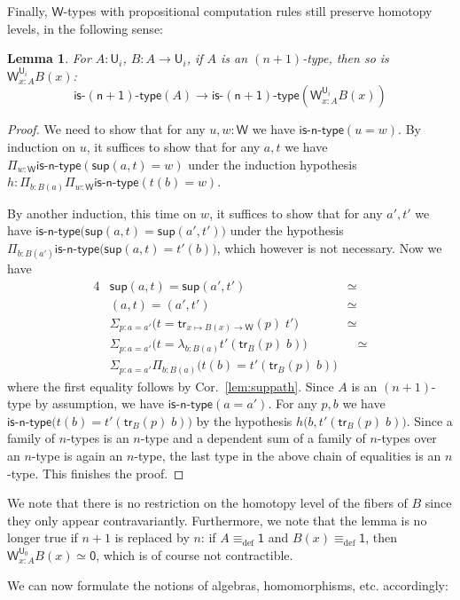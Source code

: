\documentclass[reqno,10pt,a4paper,oneside]{amsart}
\numberwithin{equation}{section}
\theoremstyle{mythm}
\newtheorem{lemma}[theorem]{Lemma}
\theoremstyle{mydef}
\theoremstyle{myrmk}
\newcommand{\deq}{\equiv}
\newcommand{\defeq}{\deq_{\mathrm{def}}}
\newcommand{\isntype}[1]{\mathsf{is}\text{-}\mathsf{#1}\text{-}\mathsf{type}}
\newcommand{\trans}{\mathsf{tr}}
\newcommand{\prd}[1]{\Pi_{#1}}
\newcommand{\sm}[1]{\Sigma_{#1}}
\newcommand{\lam}[1]{\lambda_{#1}}
\newcommand{\W}{\mathsf{W}}
\newcommand{\wsup}{\mathsf{sup}}
\newcommand{\one}{\mathsf{1}}
\newcommand{\zero}{\mathsf{0}}
\newcommand{\UU}{\mathsf{U}}
\begin{document}
Finally, $\W$-types with propositional computation rules still preserve homotopy levels, in the following sense:
\begin{lemma}
For $A:\UU_i$, $B : A \to \UU_i$, if $A$ is an $(n+1)$-type, then so is $\W^{\UU_i}_{x:A} B(x)$:
\[ \isntype{(n+1)}(A) \to \isntype{(n+1)}(\W^{\UU_i}_{x:A} B(x))\]
\end{lemma}
\begin{proof}
We need to show that for any $u,w : \W$ we have $\isntype{n}(u = w)$. By induction on $u$, it suffices to show that for any $a,t$ we have $\prd{w:\W} \isntype{n}(\wsup(a,t) = w)$ under the induction hypothesis $h : \prd{b:B(a)}\prd{w:\W} \isntype{n}(t(b) = w)$. 

By another induction, this time on $w$, it suffices to show that for any $a',t'$ we have
$\isntype{n}\big(\wsup(a,t) = \wsup(a',t')\big)$ under the hypothesis $\prd{b:B(a')} \isntype{n}\big(\wsup(a,t) = t'(b)\big)$, which however is not necessary. Now we have
\begin{alignat*}{4}
& \wsup(a,t) = \wsup(a',t') & \simeq \\
& (a,t) = (a',t') & \simeq \\
& \sm{p : a = a'} \big(t = \trans_{x \mapsto B(x) \to \W}(p) \; t'\big) & \simeq \\
& \sm{p : a = a'} \big(t = \lam{b:B(a)} t'(\trans_B(p) \; b)\big) & \;\;\; \simeq \\
& \sm{p : a = a'}\prd{b:B(a)} \big(t(b) = t'(\trans_B(p) \; b)\big) & \;\;\;
\end{alignat*}
where the first equality follows by Cor.~\ref{lem:suppath}. Since $A$ is an $(n+1)$-type by assumption, we have $\isntype{n}(a=a')$. For any $p,b$ we have $\isntype{n}\big(t(b) = t'(\trans_B(p) \; b)\big)$ by the hypothesis $h\big(b,t'(\trans_B(p) \; b)\big)$. Since a family of $n$-types is an $n$-type and a dependent sum of a family of $n$-types over an $n$-type is again an $n$-type, the last type in the above chain of equalities is an $n$-type. This finishes the proof.
\end{proof}

We note that there is no restriction on the homotopy level of the fibers of $B$ since they only appear contravariantly. Furthermore, we note that the lemma is no longer true if $n+1$ is replaced by $n$: if $A \defeq \one$ and $B(x) \defeq \one$, then $\W^{\UU_0}_{x:A} B(x) \simeq \zero$, which is of course not contractible. 

We can now formulate the notions of algebras, homomorphisms, etc. accordingly:
\end{document}
